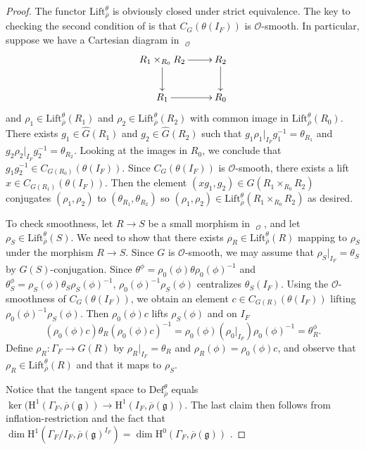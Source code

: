 \documentclass[11pt, letterpaper,english]{amsart}
\theoremstyle{plain}
\theoremstyle{definition}
\numberwithin{equation}{section}
\numberwithin{lem}{section}
\newcommand{\fg}{\mathfrak{g}}
\newcommand{\cC}{\mathcal{C}}
\newcommand{\cO}{\mathcal{O}}
\DeclareMathOperator{\Ker}{ker}
\newcommand{\rhobar}{{\overline{\rho}}}
\newcommand{\gma}[1]{\Gamma_{#1}}
\newcommand{\cent}[2]{C_{#1}(#2)}
\DeclareMathOperator{\CLN}{\widehat{\cC}}
\begin{document}
\begin{proof}
The functor $\mathrm{Lift}_{\rhobar}^{\theta}$ is obviously closed under strict equivalence.  The key to checking the second condition of \cite[Definition 2.3]{Booher19} is that $\cent{G}{\theta(I_F)}$ is $\cO$-smooth.  In particular, suppose we have a Cartesian diagram in $\CLN_{\cO}$
 \[
  \xymatrix{
  R_1 \times_{R_0} R_2 \ar[r]\ar[d] & R_2\ar[d]\\
  R_1 \ar[r] & R_0
  }
 \]
and $\rho_1 \in \mathrm{Lift}_{\rhobar}^{\theta}(R_1) $ and $\rho_2 \in \mathrm{Lift}_{\rhobar}^{\theta}(R_2)$ with common image in $\mathrm{Lift}_{\rhobar}^{\theta}(R_0)$.  There exists $g_1 \in \widehat{G}(R_1)$ and $g_2 \in \widehat{G}(R_2)$ such that $g_1 \rho_1|_{I_F} g_1^{-1} = \theta_{R_1}$ and $g_2 \rho_2 |_{I_F} g_2^{-1} = \theta_{R_2}$.  Looking at the images in $R_0$, we conclude that $g_1 g_2^{-1} \in C_{G(R_0)}(\theta(I_F))$. Since $\cent{G}{\theta(I_F)}$ is $\cO$-smooth, there exists a lift $x \in C_{G(R_1)}(\theta(I_F))$.  Then the element $(x g_1, g_2) \in G(R_1 \times_{R_0} R_2)$ conjugates $(\rho_1,\rho_2)$ to $(\theta_{R_1},\theta_{R_2})$ so $(\rho_1,\rho_2) \in \mathrm{Lift}_{\rhobar}^{\theta}(R_1 \times_{R_0} R_2)$ as desired.

To check smoothness, let $R \to S$ be a small morphism in $\CLN_{\cO}$, and let $\rho_S \in \mathrm{Lift}_{\rhobar}^{\theta}(S)$.  We need to show that there exists $\rho_R \in \mathrm{Lift}_{\rhobar}^{\theta}(R)$ mapping to $\rho_S$ under the morphism $R \to S$. Since $G$ is $\cO$-smooth, we may assume that $\rho_S|_{I_F}=\theta_S$ by $G(S)$-conjugation. 
Since $\theta^{\phi}= \rho_0(\phi) \theta \rho_0(\phi)^{-1}$ and 
$\theta^{\phi}_S = \rho_S(\phi) \theta_S \rho_S(\phi)^{-1}$, $\rho_0(\phi)^{-1} \rho_S(\phi)$ centralizes $\theta_S(I_F)$.  Using the $\cO$-smoothness of $\cent{G}{\theta(I_F)}$, we obtain an element $c \in C_{G(R)}( \theta(I_F))$ lifting $\rho_0(\phi)^{-1} \rho_S(\phi)$.  Then $\rho_0(\phi) c$ lifts $\rho_S(\phi)$ and on $I_F$
\[
(\rho_0(\phi) c) \theta_R (\rho_0(\phi) c)^{-1} = \rho_0(\phi) (\rho_0|_{I_F}) \rho_0(\phi)^{-1} = \theta_R^{\phi}.
\]
Define $\rho_R: \gma{F} \to G(R)$ by $\rho_R|_{I_F}=\theta_R$ and $\rho_R(\phi)=\rho_0(\phi) c$, and observe that $\rho_R \in \mathrm{Lift}_{\rhobar}^{\theta}(R)$ and that it maps to $\rho_S$. 

Notice that the tangent space to $\mathrm{Def}_{\rhobar}^{\theta}$ equals 
$\Ker (\mathrm{H}^1(\gma{F}, \rhobar(\fg)) \to \mathrm{H}^1(I_F, \rhobar(\fg))$. The last claim then follows from inflation-restriction and the fact that $\dim \mathrm{H}^1(\gma{F}/I_F, \rhobar(\fg)^{I_F})=\dim \mathrm{H}^0(\gma{F}, \rhobar(\fg))$ \cite[Lemma 1]{washington95}.
\end{proof}
\end{document}
